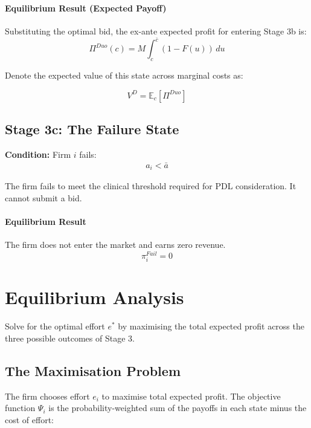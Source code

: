 \documentclass[12pt]{article}
\begin{document}
\paragraph{Equilibrium Result (Expected Payoff)}
Substituting the optimal bid, the ex-ante expected profit for entering Stage 3b is:
\begin{equation} \label{eq:duo_profit}
    \Pi^{Duo}(c) = M \int_{c}^{\bar{c}} (1 - F(u)) \, du
\end{equation}

Denote the expected value of this state across marginal costs as: 

\begin{equation}
V^D = \mathbb{E}_c[\Pi^{Duo}]    
\end{equation}


\subsection{Stage 3c: The Failure State}
\textbf{Condition:} Firm $i$ fails:
\begin{align*}
    a_i < \bar{a}
\end{align*}

The firm fails to meet the clinical threshold required for PDL consideration. It cannot submit a bid.

\paragraph{Equilibrium Result}
The firm does not enter the market and earns zero revenue.
\begin{equation}
    \pi_i^{Fail} = 0
\end{equation}

\newpage

\section{Equilibrium Analysis}
Solve for the optimal effort $e^*$ by maximising the total expected profit across the three possible outcomes of Stage 3.

\subsection{The Maximisation Problem}
The firm chooses effort $e_i$ to maximise total expected profit. The objective function $\Psi_i$ is the probability-weighted sum of the payoffs in each state minus the cost of effort:
\end{document}
